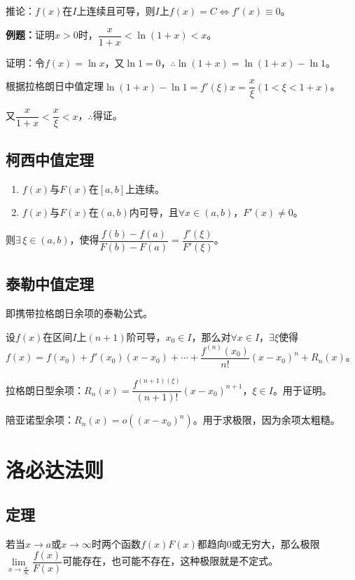 \documentclass[UTF8, 12pt]{ctexart}
\begin{document}
        推论：$f(x)$在$I$上连续且可导，则$I$上$f(x)=C\Leftrightarrow f'(x)\equiv 0$。

        \textbf{例题：}证明$x>0$时，$\dfrac{x}{1+x}<\ln(1+x)<x$。

        证明：令$f(x)=\ln x$，又$\ln 1=0$，$\therefore\ln(1+x)=\ln(1+x)-\ln 1$。

        根据拉格朗日中值定理$\ln(1+x)-\ln 1=f'(\xi)x=\dfrac{x}{\xi}(1<\xi<1+x)$。

        又$\dfrac{x}{1+x}<\dfrac{x}{\xi}<x$，$\therefore$得证。

        \subsection{柯西中值定理}

        \begin{enumerate}
            \item $f(x)$与$F(x)$在$[a,b]$上连续。
            \item $f(x)$与$F(x)$在$(a,b)$内可导，且$\forall x\in(a,b)$，$F'(x)\neq 0$。
        \end{enumerate}

        则$\exists\,\xi\in(a,b)$，使得$\dfrac{f(b)-f(a)}{F(b)-F(a)}=\dfrac{f'(\xi)}{F'(\xi)}$。

        \subsection{泰勒中值定理}

        即携带拉格朗日余项的泰勒公式。

        设$f(x)$在区间$I$上$(n+1)$阶可导，$x_0\in I$，那么对$\forall x\in I$，$\exists\xi$使得$f(x)=f(x_0)+f'(x_0)(x-x_0)+\cdots+\dfrac{f^{(n)}(x_0)}{n!}(x-x_0)^n+R_n(x)$。

        拉格朗日型余项：$R_n(x)=\dfrac{f^{(n+1)(\xi)}}{(n+1)!}(x-x_0)^{n+1}$，$\xi\in I$。用于证明。

        陪亚诺型余项：$R_n(x)=o((x-x_0)^n)$。用于求极限，因为余项太粗糙。

        \section{洛必达法则}

        \subsection{定理}

        若当$x\to a$或$x\to\infty$时两个函数$f(x)F(x)$都趋向0或无穷大，那么极限$\lim\limits_{x\to \frac{a}{\infty}}\dfrac{f(x)}{F(x)}$可能存在，也可能不存在，这种极限就是不定式。\medskip
\end{document}

